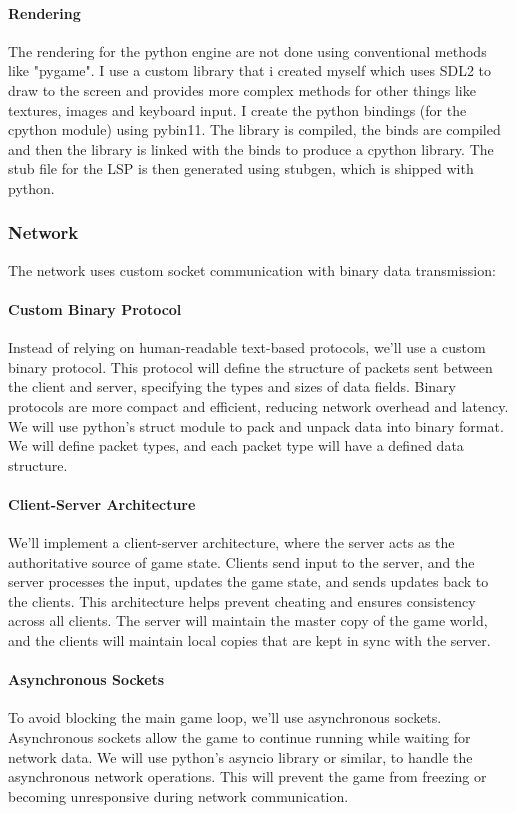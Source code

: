 \documentclass{article}
\begin{document}
\paragraph{Rendering}
The rendering for the python engine are not done using conventional methods like "pygame". I use a custom library that i created myself which uses SDL2 to draw to the screen and provides more complex methods for other things like textures, images and keyboard input. I create the python bindings (for the cpython module) using pybin11. The library is compiled, the binds are compiled and then the library is linked with the binds to produce a cpython library. The stub file for the LSP is then generated using stubgen, which is shipped with python.

\subsubsection{Network}

The network uses custom socket communication with binary data transmission:

\paragraph{Custom Binary Protocol}
Instead of relying on human-readable text-based protocols, we'll use a custom binary protocol. This protocol will define the structure of packets sent between the client and server, specifying the types and sizes of data fields. Binary protocols are more compact and efficient, reducing network overhead and latency. We will use python's struct module to pack and unpack data into binary format. We will define packet types, and each packet type will have a defined data structure.

\paragraph{Client-Server Architecture}
We'll implement a client-server architecture, where the server acts as the authoritative source of game state. Clients send input to the server, and the server processes the input, updates the game state, and sends updates back to the clients. This architecture helps prevent cheating and ensures consistency across all clients. The server will maintain the master copy of the game world, and the clients will maintain local copies that are kept in sync with the server.

\paragraph{Asynchronous Sockets}
To avoid blocking the main game loop, we'll use asynchronous sockets. Asynchronous sockets allow the game to continue running while waiting for network data. We will use python's asyncio library or similar, to handle the asynchronous network operations. This will prevent the game from freezing or becoming unresponsive during network communication.
\end{document}
